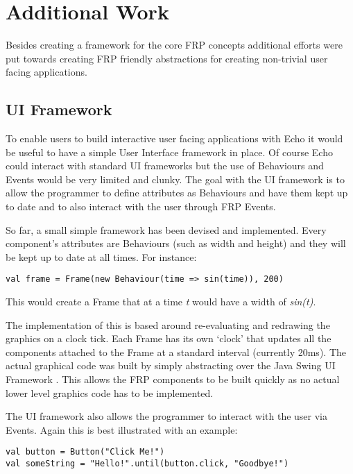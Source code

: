 \chapter{Additional Work}
  Besides creating a framework for the core FRP concepts additional efforts
  were put towards creating FRP friendly abstractions for creating non-trivial user facing
  applications.
  
  \section{UI Framework}
    To enable users to build interactive user facing applications with Echo it would be useful to have a simple User 
    Interface framework in place. Of course Echo could interact with standard UI frameworks but the use of Behaviours 
    and Events would be very limited and clunky. The goal with the UI framework is to allow the programmer to define 
    attributes as Behaviours and have them kept up to date and to also interact with the user through FRP 
    Events. 

    So far, a small simple framework has been devised and implemented. Every component's attributes are Behaviours
    (such as width and height) and they will be kept up to date at all times. For instance:

\begin{verbatim}
val frame = Frame(new Behaviour(time => sin(time)), 200) 
\end{verbatim}

    This would create a Frame that at a time \emph{t} would have a width of \emph{sin(t)}.

    The implementation of this is based around re-evaluating and redrawing the graphics on a clock tick. Each 
    Frame has its own `clock' that updates all the components attached to the Frame at a standard interval (currently 
    20ms). The actual graphical code was built by simply abstracting over the Java Swing UI Framework \cite{Oracle}. This 
    allows the FRP 
    components to be built quickly as no actual lower level graphics code has to be implemented.

    The UI framework also allows the programmer to interact with the user via Events. Again this is best illustrated 
    with an example:

\begin{verbatim}
val button = Button("Click Me!")
val someString = "Hello!".until(button.click, "Goodbye!") 
\end{verbatim}

